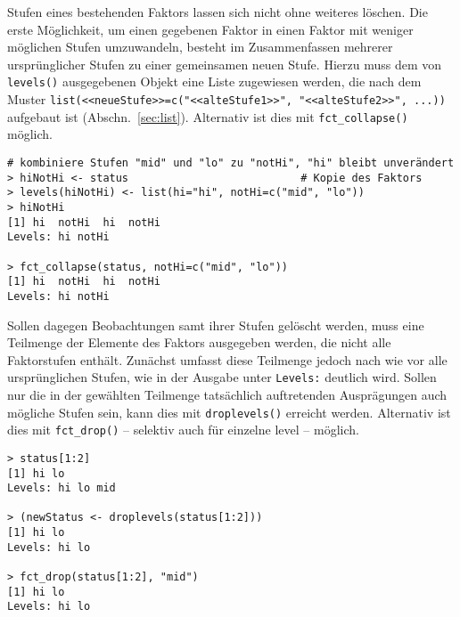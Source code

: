 Stufen eines bestehenden Faktors lassen sich nicht ohne weiteres löschen. Die erste Möglichkeit, um einen gegebenen Faktor in einen Faktor mit weniger möglichen Stufen umzuwandeln, besteht im Zusammenfassen mehrerer ursprünglicher Stufen zu einer gemeinsamen neuen Stufe. Hierzu muss dem von \lstinline!levels()! ausgegebenen Objekt eine Liste zugewiesen werden, die nach dem Muster \lstinline!list(<<neueStufe>>=c("<<alteStufe1>>", "<<alteStufe2>>", ...))! aufgebaut ist (Abschn.\ \ref{sec:list}). Alternativ ist dies mit \lstinline!fct_collapse()! möglich.
\begin{lstlisting}
# kombiniere Stufen "mid" und "lo" zu "notHi", "hi" bleibt unverändert
> hiNotHi <- status                           # Kopie des Faktors
> levels(hiNotHi) <- list(hi="hi", notHi=c("mid", "lo"))
> hiNotHi
[1] hi  notHi  hi  notHi
Levels: hi notHi

> fct_collapse(status, notHi=c("mid", "lo"))
[1] hi  notHi  hi  notHi
Levels: hi notHi
\end{lstlisting}

Sollen dagegen Beobachtungen samt ihrer Stufen gelöscht werden, muss eine Teilmenge der Elemente des Faktors ausgegeben werden, die nicht alle Faktorstufen enthält. Zunächst umfasst diese Teilmenge jedoch nach wie vor alle ursprünglichen Stufen, wie in der Ausgabe unter \lstinline!Levels:! deutlich wird. Sollen nur die in der gewählten Teilmenge tatsächlich auftretenden Ausprägungen auch mögliche Stufen sein, kann dies mit \lstinline!droplevels()! erreicht werden. Alternativ ist dies mit \lstinline!fct_drop()! -- selektiv auch für einzelne level -- möglich.
\begin{lstlisting}
> status[1:2]
[1] hi lo
Levels: hi lo mid

> (newStatus <- droplevels(status[1:2]))
[1] hi lo
Levels: hi lo

> fct_drop(status[1:2], "mid")
[1] hi lo
Levels: hi lo
\end{lstlisting}

